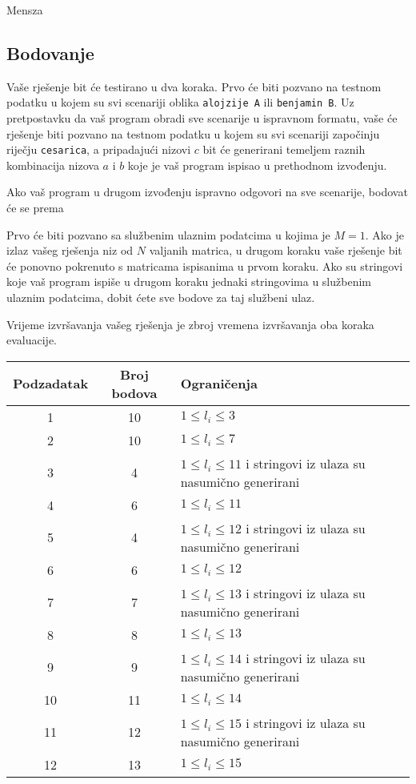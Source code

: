 \begin{statement}[
  problempoints=100,
  timelimit=1 sekunda,
  memorylimit=512 MiB,
]{Mensza}
\subsection*{Bodovanje}
Vaše rješenje bit će testirano u dva koraka. Prvo će biti pozvano na testnom
podatku u kojem su svi scenariji oblika \texttt{alojzije A} ili
\texttt{benjamin B}. Uz pretpostavku da vaš program obradi sve scenarije u
ispravnom formatu, vaše će rješenje biti pozvano na testnom podatku u kojem
su svi scenariji započinju riječju \texttt{cesarica}, a pripadajući nizovi $c$
bit će generirani temeljem raznih kombinacija nizova $a$ i $b$ koje je vaš
program ispisao u prethodnom izvođenju.

Ako vaš program u drugom izvođenju ispravno odgovori na sve scenarije, bodovat
će se prema


Prvo će biti pozvano sa
službenim ulaznim podatcima u kojima je $M=1$. Ako je izlaz vašeg
rješenja niz od $N$ valjanih matrica, u drugom koraku vaše rješenje bit
će ponovno pokrenuto s matricama ispisanima u prvom koraku.
Ako su stringovi koje vaš program ispiše u drugom koraku jednaki
stringovima u službenim ulaznim podatcima, dobit ćete sve bodove za
taj službeni ulaz.

Vrijeme izvršavanja vašeg rješenja je zbroj vremena izvršavanja
oba koraka evaluacije.

{\renewcommand{\arraystretch}{1.4}
  \setlength{\tabcolsep}{6pt}
  \begin{tabular}{ccl}
   Podzadatak & Broj bodova & Ograničenja \\ \midrule
    1 & 10 & $1 \le l_i \le 3$ \\
    2 & 10 & $1 \le l_i \le 7$ \\
    3 & 4 & $1 \le l_i \le 11$ i stringovi iz ulaza su nasumično generirani\\
    4 & 6 & $1 \le l_i \le 11$ \\
    5 & 4 & $1 \le l_i \le 12$ i stringovi iz ulaza su nasumično generirani\\
    6 & 6 & $1 \le l_i \le 12$ \\
    7 & 7 & $1 \le l_i \le 13$ i stringovi iz ulaza su nasumično generirani\\
    8 & 8 & $1 \le l_i \le 13$ \\
    9 & 9 & $1 \le l_i \le 14$ i stringovi iz ulaza su nasumično generirani\\
   10 & 11 & $1 \le l_i \le 14$ \\
   11 & 12 & $1 \le l_i \le 15$ i stringovi iz ulaza su nasumično generirani\\
   12 & 13 & $1 \le l_i \le 15$
\end{tabular}}


\end{statement}
